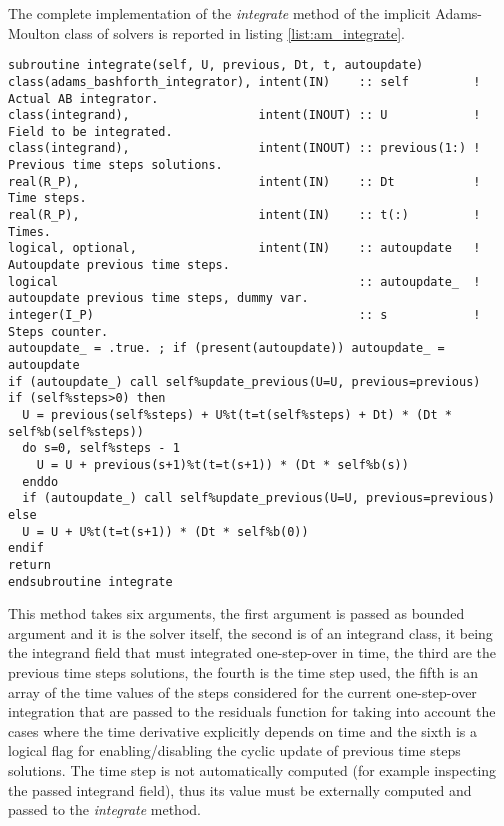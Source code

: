 The complete implementation of the \emph{integrate} method of the implicit Adams-Moulton class of solvers is reported in listing \ref{list:am_integrate}.

\begin{lstlisting}[firstnumber=1,style=code,caption={implementation of the \emph{integrate} method of explicit Adams-Moulton class},label={list:am_integrate}]
subroutine integrate(self, U, previous, Dt, t, autoupdate)
class(adams_bashforth_integrator), intent(IN)    :: self         ! Actual AB integrator.
class(integrand),                  intent(INOUT) :: U            ! Field to be integrated.
class(integrand),                  intent(INOUT) :: previous(1:) ! Previous time steps solutions.
real(R_P),                         intent(IN)    :: Dt           ! Time steps.
real(R_P),                         intent(IN)    :: t(:)         ! Times.
logical, optional,                 intent(IN)    :: autoupdate   ! Autoupdate previous time steps.
logical                                          :: autoupdate_  ! autoupdate previous time steps, dummy var.
integer(I_P)                                     :: s            ! Steps counter.
autoupdate_ = .true. ; if (present(autoupdate)) autoupdate_ = autoupdate
if (autoupdate_) call self%update_previous(U=U, previous=previous)
if (self%steps>0) then
  U = previous(self%steps) + U%t(t=t(self%steps) + Dt) * (Dt * self%b(self%steps))
  do s=0, self%steps - 1
    U = U + previous(s+1)%t(t=t(s+1)) * (Dt * self%b(s))
  enddo
  if (autoupdate_) call self%update_previous(U=U, previous=previous)
else
  U = U + U%t(t=t(s+1)) * (Dt * self%b(0))
endif
return
endsubroutine integrate
\end{lstlisting}

This method takes six arguments, the first argument is passed as bounded argument and it is the solver itself, the second is of an integrand class, it being the integrand field that must integrated one-step-over in time, the third are the previous time steps solutions, the fourth is the time step used, the fifth is an array of the time values of the steps considered for the current one-step-over integration that are passed to the residuals function for taking into account the cases where the time derivative explicitly depends on time and the sixth is a logical flag for enabling/disabling the cyclic update of previous time steps solutions. The time step is not automatically computed (for example inspecting the passed integrand field), thus its value must be externally computed and passed to the \emph{integrate} method.

